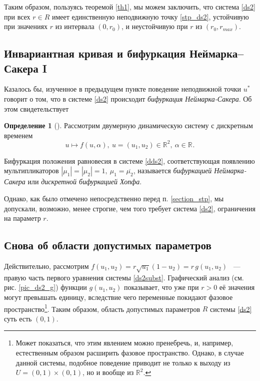 \documentclass[oneside,final,12pt]{article}
\newcommand*\Rn  [1]{\mathbb{R}^{#1}}
\newcommand*\abs[1]{|#1|}
\newcommand*\inter[2]{(#1,#2)}
\theoremstyle{plain}
\theoremstyle{remark}
\theoremstyle{definition}
\newtheorem{definition}{Определение}
\theoremstyle{plain}
\begin{document}
		Таким образом, пользуясь теоремой \ref{th1}, мы можем заключить, что система \eqref{ds2} при всех \(r \in R\) имеет единственную неподвижную точку \eqref{stp_ds2}, устойчивую при значениях \(r\) из интервала \(\inter{0}{r_0}\), и неустойчивую при \(r\) из \(\inter{r_0}{r_{max}}\).

	\subsection{Инвариантная кривая и бифуркация Неймарка--Сакера I}
		
		Казалось бы, изученное в предыдущем пункте поведение неподвижной точки \(u^*\) говорит о том, что в системе \eqref{ds2} происходит \emph{бифуркация Неймарка-Сакера}. Об этом свидетельствует

		\begin{definition}[\cite{DSMB}]
			Рассмотрим двумерную динамическую систему с дискретным временем
			\begin{equation}\label{dds2}
				u \mapsto f(u,\alpha),\: u = (u_1,u_2) \in \Rn{2}, \: \alpha \in \Rn{}.
			\end{equation}

			Бифуркация положения равновесия в системе \eqref{dds2}, соответствующая появлению мультипликаторов \(\abs{\mu_1} = \abs{\mu_2} = 1,\: \mu_1 = \overline{\mu_2}\), называется \emph{бифуркацией Неймарка-Сакера} или \emph{дискретной бифуркацией Хопфа}.
		\end{definition}

		Однако, как было отмечено непосредственно перед п. \ref{section_stp}, мы допускали, возможно, менее строгие, чем того требует система \eqref{ds2}, ограничения на параметр \(r\).

	\subsection{Снова об области допустимых параметров}

		Действительно, рассмотрим \(f(u_1,u_2) =  r \sqrt{u_1} (1-u_2)  = r\,g(u_1,u_2) \) ~--- правую часть первого уравнения системы \eqref{ds2subst}. Графический анализ (см. рис. \ref{pic_ds2_g}) функции \(g(u_1,u_2)\) показывает, что уже при \(r > 0\) её значения могут превышать единицу, вследствие чего переменные покидают фазовое пространство\footnote{Может показаться, что этим явлением можно пренебречь, и, например, естественным образом расширить фазовое пространство. Однако, в случае данной системы, подобное поведение приводит не только к выходу из \(U=\inter{0}{1}\times\inter{0}{1}\), но и вообще из \(\Rn{2}\).}. Таким образом, область допустимых параметров \(R\) системы \eqref{ds2} суть есть \(\inter{0}{1}\).
\end{document}
